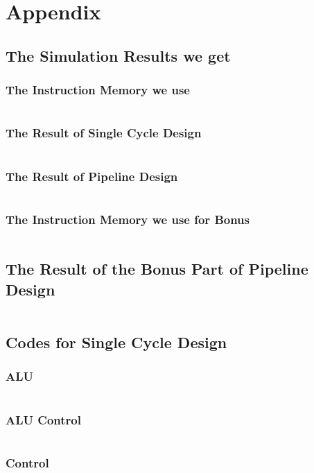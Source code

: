 \documentclass{article}[12pt]
\begin{document}
	\newpage
	\section{Appendix}
	\subsection{The Simulation Results we get}
		\subsubsection{The Instruction Memory we use}
			\inputminted{ca65}{pipeline/InstructionMem_for_P2_Demo_updated.txt}
		\subsubsection{The Result of Single Cycle Design}
			\inputminted{ca65}{textualresultsingle.txt}
	
		\subsubsection{The Result of Pipeline Design}
			\inputminted{ca65}{textualresultpipeline.txt}
		\subsubsection{The Instruction Memory we use for Bonus}
			\inputminted{ca65}{pipeline/InstructionMem_for_P2_Demo_Bonus.txt}
	
		\subsection{The Result of the Bonus Part of Pipeline Design}
			\inputminted{ca65}{pipeline/bonustextualresult.txt}
	
	\subsection{Codes for Single Cycle Design}
		\subsubsection{ALU}
			\inputminted{verilog}{singlecycle/ALU.v}
		\subsubsection{ALU Control}
			\inputminted{verilog}{singlecycle/ALUControl.v}
		\subsubsection{Control}
			\inputminted{verilog}{singlecycle/Control.v}
\end{document}

